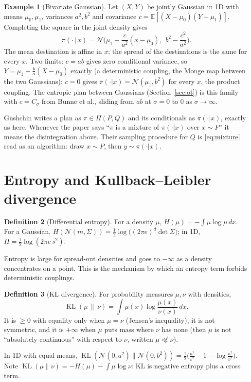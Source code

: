 \documentclass[11pt]{article}
\newcommand{\E}{\mathbb{E}}
\newcommand{\KL}{\operatorname{KL}}
\newcommand{\Nc}{\mathcal{N}}
\theoremstyle{definition}
\newtheorem{definition}{Definition}[section]
\newtheorem{example}[definition]{Example}
\theoremstyle{plain}
\begin{document}
\begin{example}[Bivariate Gaussian]
\label{ex:bigauss}
Let $(X,Y)$ be jointly Gaussian in 1D with means $\mu_0,\mu_1$, variances $a^2,b^2$ and
covariance $c=\E[(X-\mu_0)(Y-\mu_1)]$. Completing the square in the joint density gives
\begin{equation}
  \label{eq:gausscond}
  \pi(\cdot\,|\,x)=\Nc\!\Big(\mu_1+\frac{c}{a^2}(x-\mu_0),\ \ b^2-\frac{c^2}{a^2}\Big).
\end{equation}
The mean destination is affine in $x$; the spread of the destinations is the same for every
$x$. Two limits: $c=ab$ gives zero conditional variance, so $Y=\mu_1+\frac{b}{a}(X-\mu_0)$
exactly (a deterministic coupling, the Monge map between the two Gaussians); $c=0$ gives
$\pi(\cdot|x)=\Nc(\mu_1,b^2)$ for every $x$, the product coupling. The entropic plan between
Gaussians (Section~\ref{sec:ot}) is this family with $c=C_\sigma$ from Bunne et al.,
sliding from $ab$ at $\sigma=0$ to $0$ as $\sigma\to\infty$.
\end{example}

\begin{readbox}
Gushchin writes a plan as $\pi\in\Pi(P,Q)$ and its conditionals as $\pi(\cdot|x)$, exactly
as here. Whenever the paper says ``$\pi$ is a mixture of $\pi(\cdot|x)$ over $x\sim P$'' it
means the disintegration above. Their sampling procedure for $Q$ is \eqref{eq:mixture}
read as an algorithm: draw $x\sim P$, then $y\sim\pi(\cdot|x)$.
\end{readbox}

\section{Entropy and Kullback--Leibler divergence}
\label{sec:entropy}

\begin{definition}[Differential entropy]
For a density $\mu$, $H(\mu)=-\int\mu\log\mu\,dx$. For a Gaussian,
$H(\Nc(m,\Sigma))=\tfrac12\log\big((2\pi e)^d\det\Sigma\big)$; in 1D, $H=\tfrac12\log(2\pi e\,s^2)$.
\end{definition}
Entropy is large for spread-out densities and goes to $-\infty$ as a density concentrates
on a point. This is the mechanism by which an entropy term forbids deterministic couplings.

\begin{definition}[KL divergence]
For probability measures $\mu,\nu$ with densities,
\[
  \KL(\mu\,\|\,\nu)=\int\mu(x)\log\frac{\mu(x)}{\nu(x)}\,dx .
\]
It is $\ge0$ with equality only when $\mu=\nu$ (Jensen's inequality), it is not symmetric,
and it is $+\infty$ when $\mu$ puts mass where $\nu$ has none (then $\mu$ is not
``absolutely continuous'' with respect to $\nu$, written $\mu\not\ll\nu$).
\end{definition}
In 1D with equal means, $\KL(\Nc(0,a^2)\|\Nc(0,b^2))=\tfrac12\big(\tfrac{a^2}{b^2}-1-\log\tfrac{a^2}{b^2}\big)$.
Note $\KL(\mu\|\nu)=-H(\mu)-\int\mu\log\nu$: KL is negative entropy plus a cross term.
\end{document}
